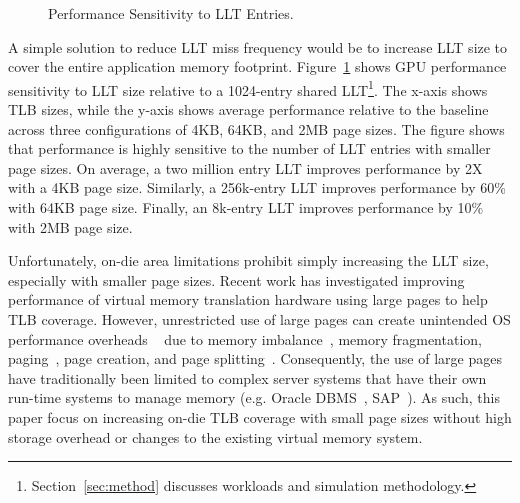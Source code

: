 \begin{figure}[t] 
\vspace{0. in}
\centering
\centerline{}

	\caption{\small Performance Sensitivity to LLT Entries. \normalsize}

\label{fig:tlb_sensitivity} 
\vspace{-0.15 in}
\end{figure}

A simple solution to reduce LLT miss frequency would be to increase
LLT size to cover the entire application memory footprint.
Figure~\ref{fig:tlb_sensitivity} shows GPU performance sensitivity to
LLT size relative to a 1024-entry shared
LLT\footnote{Section~\ref{sec:method} discusses workloads and
simulation methodology.}. The x-axis shows TLB sizes, while the y-axis
shows average performance relative to the baseline across three
configurations of 4KB, 64KB, and 2MB page sizes. The figure shows that
performance is highly sensitive to the number of LLT entries with
smaller page sizes. On average, a two million entry LLT improves
performance by 2X with a 4KB page size. Similarly, a 256k-entry LLT
improves performance by 60\% with 64KB page size. Finally, an 8k-entry
LLT improves performance by 10\% with 2MB page size.

Unfortunately, on-die area limitations prohibit simply increasing the
LLT size, especially with smaller page sizes. Recent work has
investigated improving performance of virtual memory translation
hardware using large pages to help TLB coverage. However, unrestricted
use of large pages can create unintended OS performance overheads
~\cite{SuperPageProblem, TwoPageSize} due to memory
imbalance~\cite{numa-harmful}, memory fragmentation,
paging~\cite{cameo}, page creation, and page
splitting~\cite{largepagevm}. Consequently, the use of large pages
have traditionally been limited to complex server systems that have
their own run-time systems to manage memory (e.g. Oracle
DBMS~\cite{oracle_dbms}, SAP~\cite{sap}). As such, this paper focus on
increasing on-die TLB coverage with small page sizes without high
storage overhead or changes to the existing virtual memory system.

